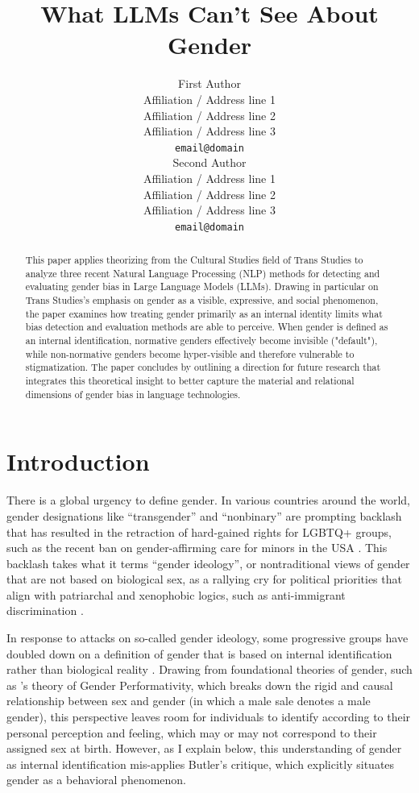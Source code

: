 \documentclass[11pt]{article}
\title{What LLMs Can't See About Gender}
\author{First Author \\
  Affiliation / Address line 1 \\
  Affiliation / Address line 2 \\
  Affiliation / Address line 3 \\
  \texttt{email@domain} \\\And
  Second Author \\
  Affiliation / Address line 1 \\
  Affiliation / Address line 2 \\
  Affiliation / Address line 3 \\
  \texttt{email@domain} \\}
\begin{document}
\maketitle
\begin{abstract}
This paper applies theorizing from the Cultural Studies field of Trans Studies to analyze three recent Natural Language Processing (NLP) methods for detecting and evaluating gender bias in Large Language Models (LLMs). Drawing in particular on Trans Studies’s emphasis on gender as a visible, expressive, and social phenomenon, the paper examines how treating gender primarily as an internal identity limits what bias detection and evaluation methods are able to perceive. When gender is defined as an internal identification, normative genders effectively become invisible ("default"), while non-normative genders become hyper-visible and therefore vulnerable to stigmatization. The paper concludes by outlining a direction for future research that integrates this theoretical insight to better capture the material and relational dimensions of gender bias in language technologies.
\end{abstract}

\section{Introduction}
There is a global urgency to define gender. In various countries around the world, gender designations like “transgender” and “nonbinary” are prompting backlash that has resulted in the retraction of hard-gained rights for LGBTQ+ groups, such as the recent ban on gender-affirming care for minors in the USA \citep{karni:2025}. This backlash takes what it terms “gender ideology”, or nontraditional views of gender that are not based on biological sex, as a rallying cry for political priorities that align with patriarchal and xenophobic logics, such as anti-immigrant discrimination \citep{butler:2024,hrc:2025,shakhsari:2013}.

In response to attacks on so-called gender ideology, some progressive groups have doubled down on a definition of gender that is based on internal identification rather than biological reality \citep{drescher:2025}. Drawing from foundational theories of gender, such as \citet{butler:1990}'s theory of Gender Performativity, which breaks down the rigid and causal relationship between sex and gender (in which a male sale denotes a male gender), this perspective leaves room for individuals to identify according to their personal perception and feeling, which may or may not correspond to their assigned sex at birth. However, as I explain below, this understanding of gender as internal identification mis-applies Butler’s critique, which explicitly situates gender as a behavioral phenomenon.
\end{document}
